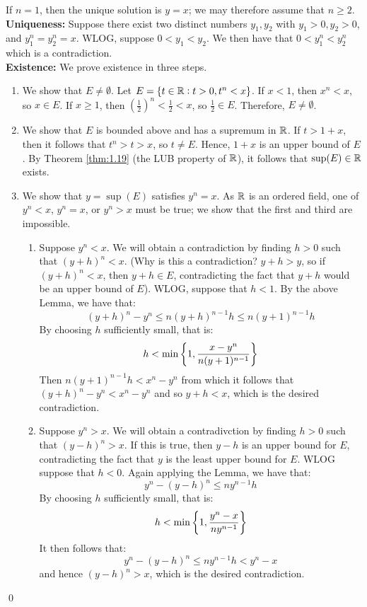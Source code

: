 \begin{nproof}
    If $n = 1$, then the unique solution is $y = x$; we may therefore assume that $n \geq 2$.
    \\ \textbf{Uniqueness:} Suppose there exist two distinct numbers $y_1, y_2$ with $y_1 > 0, y_2 > 0$, and $y_1^n = y_2^n = x$. WLOG, suppose $0 < y_1 < y_2$. We then have that $0 < y_1^n < y_2^n$ which is a contradiction. 
    \\ \textbf{Existence:} We prove existence in three steps.
    \begin{enumerate}[1.]
        \item We show that $E \neq \emptyset$. Let $E = \set{t \in \mathbb{R}: t > 0, t^n < x}$. If $x < 1$, then $x^n < x$, so $x \in E$. If $x \geq 1$, then $\left(\frac{1}{2}\right)^n < \frac{1}{2} < x$, so $\frac{1}{2} \in E$. Therefore, $E \neq \emptyset$.
        \item We show that $E$ is bounded above and has a supremum in $\mathbb{R}$. If $t > 1 + x$, then it follows that $t^n > t > x$, so $t \neq E$. Hence, $1 + x$ is an upper bound of $E$. By Theorem \ref{thm:1.19} (the LUB property of $\mathbb{R}$), it follows that $\sup(E) \in \mathbb{R}$ exists. 
        \item We show that $y = \sup(E)$ satisfies $y^n = x$. As $\mathbb{R}$ is an ordered field, one of $y^n < x$, $y^n = x$, or $y^n > x$ must be true; we show that the first and third are impossible.
        \begin{enumerate}
            \item Suppose $y^n < x$. We will obtain a contradiction by finding $h > 0$ such that $(y+h)^n < x$. (Why is this a contradiction? $y+ h > y$, so if $(y+h)^n < x$, then $y + h \in E$, contradicting the fact that $y + h$ would be an upper bound of $E$). WLOG, suppose that $h < 1$. By the above Lemma, we have that:
            \[(y+h)^n - y^n \leq n(y+h)^{n-1}h \leq n(y+1)^{n-1}h\]
            By choosing $h$ sufficiently small, that is:
            \[h < \min\set{1, \frac{x-y^n}{n(y+1)^{n-1}}}\]
            Then $n(y+1)^{n-1}h < x^n - y^n$ from which it follows that $(y+h)^n - y^n < x^n - y^n$ and so $y+h < x$, which is the desired contradiction.
            \item Suppose $y^n > x$. We will obtain a contradivction by finding $h > 0$ such that $(y-h)^n > x$. If this is true, then $y-h$ is an upper bound for $E$, contradicting the fact that $y$ is the least upper bound for $E$. WLOG suppose that $h < 0$. Again applying the Lemma, we have that:
            \[y^n - (y-h)^n \leq ny^{n-1}h\]
            By choosing $h$ sufficiently small, that is:
            \[h < \min\set{1, \frac{y^n-x}{ny^{n-1}}}\]
            It then follows that:
            \[y^n - (y-h)^n \leq ny^{n-1}h < y^n - x\]
            and hence $(y-h)^n > x$, which is the desired contradiction.
        \end{enumerate} 
    \end{enumerate}
    \qed
\end{nproof}
